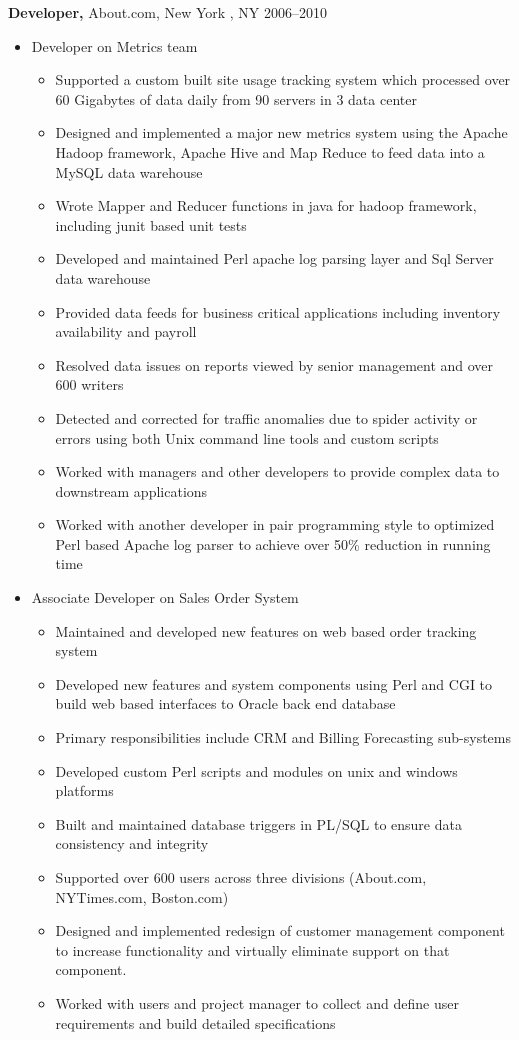 \documentclass[margin]{res}
\begin{document}
\begin{resume}
{\bf Developer,} About.com, New York , NY \hfill  2006--2010
\begin{itemize}
    \item Developer on Metrics team
      \begin{itemize}
          \item Supported a custom built site usage tracking system which processed over 60 Gigabytes of data daily from 90 servers in 3 data center
          \item Designed and implemented a major new metrics system using the Apache Hadoop framework, Apache Hive and Map Reduce to feed data into a MySQL data warehouse
          \item Wrote Mapper and Reducer functions in java for hadoop framework, including junit based unit tests
          \item Developed and maintained Perl apache log parsing layer and Sql Server data warehouse
          \item Provided data feeds for business critical applications including inventory availability and payroll
          \item Resolved data issues on reports viewed by senior management and over 600 writers
          \item Detected and corrected for traffic anomalies due to spider activity or errors using both Unix command line tools and custom scripts
          \item Worked with managers and other developers to provide complex data to downstream applications
          \item Worked with another developer in pair programming style to optimized Perl based Apache log parser to achieve over 50\% reduction in running time
      \end{itemize}
    \item Associate Developer on Sales Order System
      \begin{itemize}
          \item Maintained and developed new features on web based order tracking system
          \item Developed new features and system components using Perl and CGI to build web based interfaces to Oracle back end database
          \item Primary responsibilities include CRM and Billing Forecasting sub-systems
          \item Developed custom Perl scripts and modules on unix and windows platforms
          \item Built and maintained database triggers in PL/SQL to ensure data consistency and integrity
          \item Supported over 600 users across three divisions (About.com, NYTimes.com, Boston.com)
          \item Designed and implemented redesign of customer management component to increase functionality and virtually eliminate support on that component.
          \item Worked with users and project manager to collect and define user requirements and build detailed specifications
      \end{itemize}
\end{itemize}


\end{resume}
\end{document}
